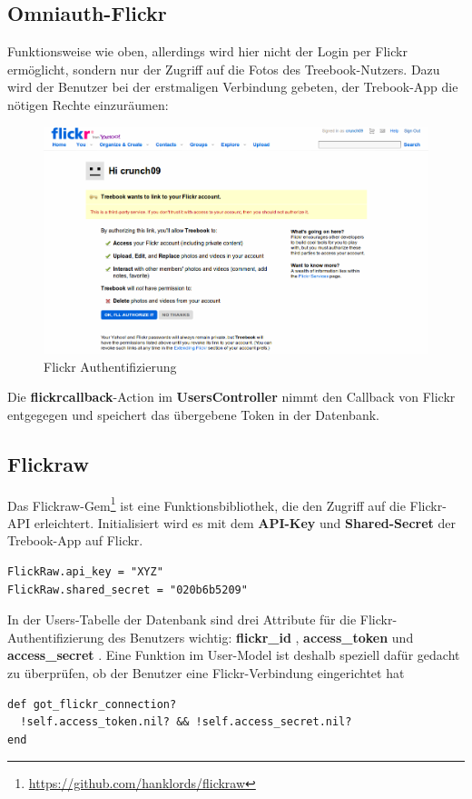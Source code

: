 \documentclass[10pt,a4paper]{book}
\makeatletter
\def\ScaleIfNeeded{%
\ifdim\Gin@nat@width>\linewidth
\linewidth
\else
\Gin@nat@width
\fi
}
\makeatother
\begin{document}
\subsection{Omniauth-Flickr}
Funktionsweise wie oben, allerdings wird hier nicht der Login per Flickr ermöglicht, sondern nur der Zugriff auf die Fotos des Treebook-Nutzers. Dazu wird der Benutzer bei der erstmaligen Verbindung gebeten, der Trebook-App die nötigen Rechte einzuräumen:
\begin{figure}[htbp]
\centering
\includegraphics[width=\ScaleIfNeeded]{Pictures/screen_flickr_auth.png}%
\caption{Flickr Authentifizierung}%
\end{figure}
Die \textbf{flickrcallback}-Action im \textbf{UsersController} nimmt den Callback von Flickr entgegegen und speichert das übergebene Token in der Datenbank.
\subsection{Flickraw}
Das Flickraw-Gem\footnote{\href{https://github.com/hanklords/flickraw}{https://github.com/hanklords/flickraw}} ist eine Funktionsbibliothek, 
die den Zugriff auf die Flickr-API erleichtert. Initialisiert wird es mit dem \textbf{API-Key} und \textbf{Shared-Secret} der Trebook-App auf Flickr.
\lstset{language=Ruby}
\begin{lstlisting}
FlickRaw.api_key = "XYZ"
FlickRaw.shared_secret = "020b6b5209"
\end{lstlisting}
In der Users-Tabelle der Datenbank sind drei Attribute für die Flickr-Authentifizierung des Benutzers wichtig: \textbf{flickr\_id} , 
\textbf{access\_token} und \textbf{access\_secret} . Eine Funktion im User-Model ist deshalb speziell dafür gedacht zu überprüfen, ob der Benutzer eine Flickr-Verbindung eingerichtet hat
\begin{lstlisting}
def got_flickr_connection?
  !self.access_token.nil? && !self.access_secret.nil?
end
\end{lstlisting}
\end{document}

